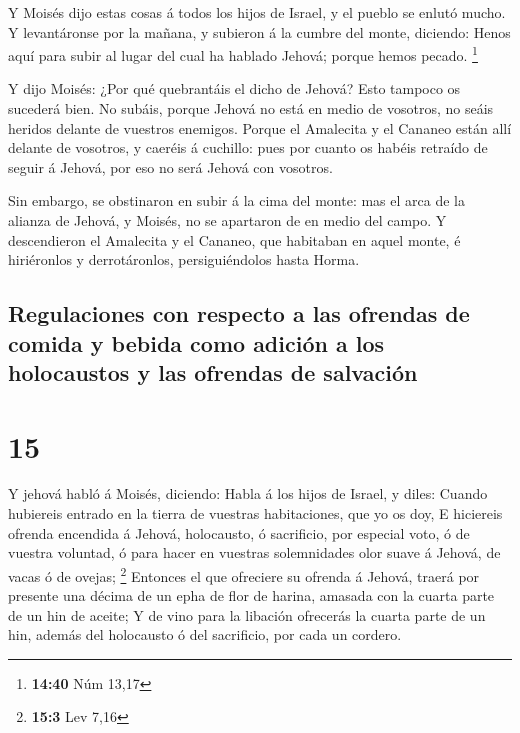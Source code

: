  Y Moisés dijo estas cosas á todos los hijos de Israel, y
el pueblo se enlutó mucho.  Y levantáronse por la mañana, y
subieron á la cumbre del monte, diciendo: Henos aquí para subir al lugar
del cual ha hablado Jehová; porque hemos pecado. \footnote{\textbf{14:40}
  Núm 13,17}

 Y dijo Moisés: ¿Por qué quebrantáis el dicho de Jehová?
Esto tampoco os sucederá bien.  No subáis, porque Jehová no
está en medio de vosotros, no seáis heridos delante de vuestros
enemigos.  Porque el Amalecita y el Cananeo están allí
delante de vosotros, y caeréis á cuchillo: pues por cuanto os habéis
retraído de seguir á Jehová, por eso no será Jehová con vosotros.

 Sin embargo, se obstinaron en subir á la cima del monte:
mas el arca de la alianza de Jehová, y Moisés, no se apartaron de en
medio del campo.  Y descendieron el Amalecita y el Cananeo,
que habitaban en aquel monte, é hiriéronlos y derrotáronlos,
persiguiéndolos hasta Horma.

\hypertarget{regulaciones-con-respecto-a-las-ofrendas-de-comida-y-bebida-como-adiciuxf3n-a-los-holocaustos-y-las-ofrendas-de-salvaciuxf3n}{%
\subsection{Regulaciones con respecto a las ofrendas de comida y bebida
como adición a los holocaustos y las ofrendas de
salvación}\label{regulaciones-con-respecto-a-las-ofrendas-de-comida-y-bebida-como-adiciuxf3n-a-los-holocaustos-y-las-ofrendas-de-salvaciuxf3n}}

\hypertarget{section-14}{%
\section{15}\label{section-14}}

 Y jehová habló á Moisés, diciendo:  Habla á los
hijos de Israel, y diles: Cuando hubiereis entrado en la tierra de
vuestras habitaciones, que yo os doy,  E hiciereis ofrenda
encendida á Jehová, holocausto, ó sacrificio, por especial voto, ó de
vuestra voluntad, ó para hacer en vuestras solemnidades olor suave á
Jehová, de vacas ó de ovejas; \footnote{\textbf{15:3} Lev 7,16}
 Entonces el que ofreciere su ofrenda á Jehová, traerá por
presente una décima de un epha de flor de harina, amasada con la cuarta
parte de un hin de aceite;  Y de vino para la libación
ofrecerás la cuarta parte de un hin, además del holocausto ó del
sacrificio, por cada un cordero.

